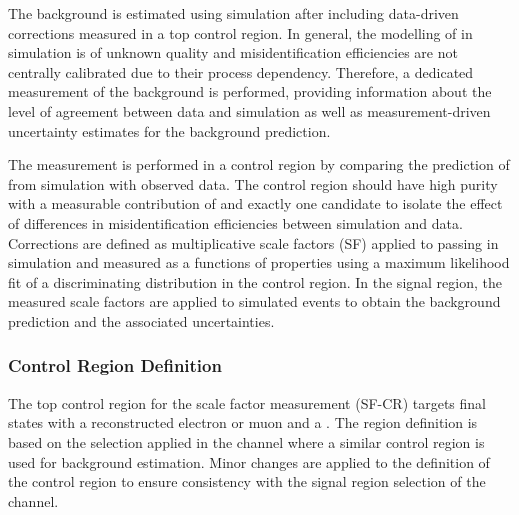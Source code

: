 The \ttbarFakes background is estimated using simulation after
including data-driven corrections measured in a top control region. In
general, the modelling of \faketauhadvis in simulation is of unknown
quality and \jettotauhadvis misidentification efficiencies are not
centrally calibrated due to their process dependency. Therefore, a
dedicated measurement of the \ttbarFakes background is performed,
providing information about the level of agreement between data and
simulation as well as measurement-driven uncertainty estimates for the
background prediction.

The measurement is performed in a control region by comparing the
prediction of \ttbarFakes from simulation with observed data. The
control region should have high \ttbar purity with a measurable
contribution of \ttbarFakes and exactly one \tauhadvis candidate to
isolate the effect of differences in misidentification efficiencies
between simulation and data. Corrections are defined as multiplicative
scale factors (SF) applied to \faketauhadvis passing \tauid in
simulation and measured as a functions of \faketauhadvis properties
using a maximum likelihood fit of a discriminating distribution in the
control region.  In the \hadhad signal region, the measured scale
factors are applied to simulated \ttbarFakes events to obtain the
background prediction and the associated uncertainties.


\subsubsection{Control Region Definition}

The top control region for the scale factor measurement (SF-CR)
targets final states with a reconstructed electron or muon and a
\tauhadvis. The region definition is based on the selection applied in
the \lephad channel where a similar control region is used for
\faketauhadvis background estimation. Minor changes are applied to the
definition of the control region to ensure consistency with the signal
region selection of the \hadhad channel.

